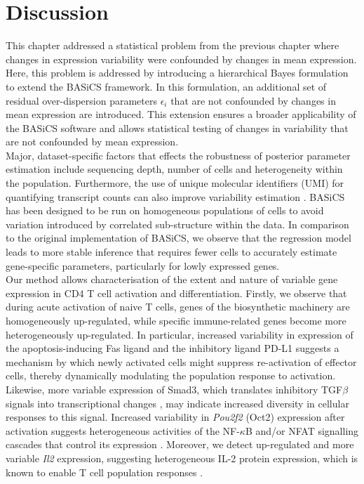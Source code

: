 
\section{Discussion}

This chapter addressed a statistical problem from the previous chapter where changes in expression variability were confounded by changes in mean expression. Here, this problem is addressed by introducing a hierarchical Bayes formulation to extend the BASiCS framework. In this formulation, an additional set of residual over-dispersion parameters $\epsilon_i$ that are not confounded by changes in mean expression are introduced. This extension ensures a broader applicability of the BASiCS software and allows statistical testing of changes in variability that are not confounded by mean expression.  \\ 

Major, dataset-specific factors that effects the robustness of posterior parameter estimation include sequencing depth, number of cells and heterogeneity within the population. Furthermore, the use of unique molecular identifiers (UMI) for quantifying transcript counts can also improve variability estimation \citep{Grun2014}. BASiCS has been designed to be run on homogeneous populations of cells to avoid variation introduced by correlated sub-structure within the data. In comparison to the original implementation of BASiCS, we observe that the regression model leads to more stable inference that requires fewer cells to accurately estimate gene-specific parameters, particularly for lowly expressed genes. \\

Our method allows characterisation of the extent and nature of variable gene expression in CD4\plus{} T cell activation and differentiation. Firstly, we observe that during acute activation of naive T cells, genes of the biosynthetic machinery are homogeneously up-regulated, while specific immune-related genes become more heterogeneously up-regulated. In particular, increased variability in expression of the apoptosis-inducing Fas ligand \citep{Strasser2009} and the inhibitory ligand PD-L1 \citep{Chikuma2016} suggests a mechanism by which newly activated cells might suppress re-activation of effector cells, thereby dynamically modulating the population response to activation. Likewise, more variable expression of Smad3, which translates inhibitory TGF$\beta$ signals into transcriptional changes \citep{Delisle2013}, may indicate increased diversity in cellular responses to this signal. Increased variability in \textit{Pou2f2} (Oct2) expression after activation suggests heterogeneous activities of the NF-$\kappa$B and/or NFAT signalling cascades that control its expression \citep{Mueller2013}.
Moreover, we detect up-regulated and more variable \textit{Il2} expression, suggesting heterogeneous IL-2 protein expression, which is known to enable T cell population responses \citep{Fuhrmann2016}. \\

